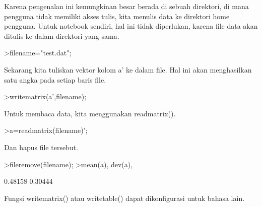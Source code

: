 \documentclass[a4paper,10pt]{article}
\begin{document}
\begin{eulernotebook}
\begin{eulercomment}
\begin{eulercomment}
\begin{eulercomment}
\begin{eulercomment}
\begin{eulercomment}
\begin{eulercomment}
\begin{eulercomment}
\begin{eulercomment}
\begin{eulercomment}
\begin{eulercomment}
\begin{eulercomment}
\begin{eulercomment}
\begin{eulercomment}
\begin{eulercomment}
\begin{eulercomment}
\begin{eulercomment}
\begin{eulercomment}
\begin{eulercomment}
\begin{eulercomment}
\begin{eulercomment}
\begin{eulercomment}
\begin{eulercomment}
\begin{eulercomment}
\begin{eulercomment}
\begin{eulercomment}
Karena pengenalan ini kemungkinan besar berada di sebuah direktori, di
mana pengguna tidak memiliki akses tulis, kita menulis data ke
direktori home pengguna. Untuk notebook sendiri, hal ini tidak
diperlukan, karena file data akan ditulis ke dalam direktori yang
sama.
\end{eulercomment}
\begin{eulerprompt}
>filename="test.dat";
\end{eulerprompt}
\begin{eulercomment}
Sekarang kita tuliskan vektor kolom a' ke dalam file. Hal ini akan
menghasilkan satu angka pada setiap baris file.
\end{eulercomment}
\begin{eulerprompt}
>writematrix(a',filename);
\end{eulerprompt}
\begin{eulercomment}
Untuk membaca data, kita menggunakan readmatrix().
\end{eulercomment}
\begin{eulerprompt}
>a=readmatrix(filename)';
\end{eulerprompt}
\begin{eulercomment}
Dan hapus file tersebut.
\end{eulercomment}
\begin{eulerprompt}
>fileremove(filename);
>mean(a), dev(a),
\end{eulerprompt}
\begin{euleroutput}
  0.48158
  0.30444
\end{euleroutput}
\begin{eulercomment}
Fungsi writematrix() atau writetable() dapat dikonfigurasi untuk
bahasa lain.


\end{eulercomment}
\end{eulercomment}
\end{eulercomment}
\end{eulercomment}
\end{eulercomment}
\end{eulercomment}
\end{eulercomment}
\end{eulercomment}
\end{eulercomment}
\end{eulercomment}
\end{eulercomment}
\end{eulercomment}
\end{eulercomment}
\end{eulercomment}
\end{eulercomment}
\end{eulercomment}
\end{eulercomment}
\end{eulercomment}
\end{eulercomment}
\end{eulercomment}
\end{eulercomment}
\end{eulercomment}
\end{eulercomment}
\end{eulercomment}
\end{eulercomment}
\end{eulernotebook}
\end{document}
